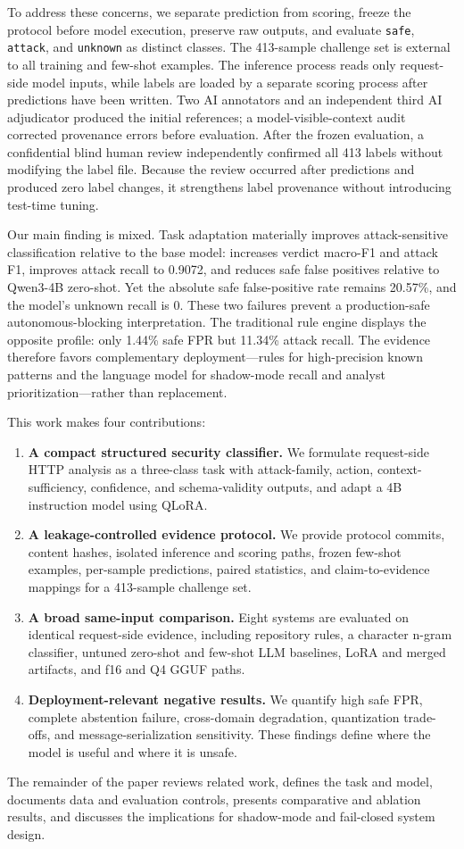 To address these concerns, we separate prediction from scoring, freeze the protocol before model execution, preserve raw outputs, and evaluate \texttt{safe}, \texttt{attack}, and \texttt{unknown} as distinct classes. The 413-sample \challenge{} challenge set is external to all training and few-shot examples. The inference process reads only request-side model inputs, while labels are loaded by a separate scoring process after predictions have been written. Two AI annotators and an independent third AI adjudicator produced the initial references; a model-visible-context audit corrected provenance errors before evaluation. After the frozen evaluation, a confidential blind human review independently confirmed all 413 labels without modifying the label file. Because the review occurred after predictions and produced zero label changes, it strengthens label provenance without introducing test-time tuning.

Our main finding is mixed. Task adaptation materially improves attack-sensitive classification relative to the base model: \model{} increases verdict macro-F1 and attack F1, improves attack recall to 0.9072, and reduces safe false positives relative to Qwen3-4B zero-shot. Yet the absolute safe false-positive rate remains 20.57\%, and the model's unknown recall is 0. These two failures prevent a production-safe autonomous-blocking interpretation. The traditional rule engine displays the opposite profile: only 1.44\% safe FPR but 11.34\% attack recall. The evidence therefore favors complementary deployment---rules for high-precision known patterns and the language model for shadow-mode recall and analyst prioritization---rather than replacement.

This work makes four contributions:
\begin{enumerate}
    \item \textbf{A compact structured security classifier.} We formulate request-side HTTP analysis as a three-class task with attack-family, action, context-sufficiency, confidence, and schema-validity outputs, and adapt a 4B instruction model using QLoRA.
    \item \textbf{A leakage-controlled evidence protocol.} We provide protocol commits, content hashes, isolated inference and scoring paths, frozen few-shot examples, per-sample predictions, paired statistics, and claim-to-evidence mappings for a 413-sample challenge set.
    \item \textbf{A broad same-input comparison.} Eight systems are evaluated on identical request-side evidence, including repository rules, a character n-gram classifier, untuned zero-shot and few-shot LLM baselines, LoRA and merged artifacts, and f16 and Q4 GGUF paths.
    \item \textbf{Deployment-relevant negative results.} We quantify high safe FPR, complete abstention failure, cross-domain degradation, quantization trade-offs, and message-serialization sensitivity. These findings define where the model is useful and where it is unsafe.
\end{enumerate}

The remainder of the paper reviews related work, defines the task and model, documents data and evaluation controls, presents comparative and ablation results, and discusses the implications for shadow-mode and fail-closed system design.
